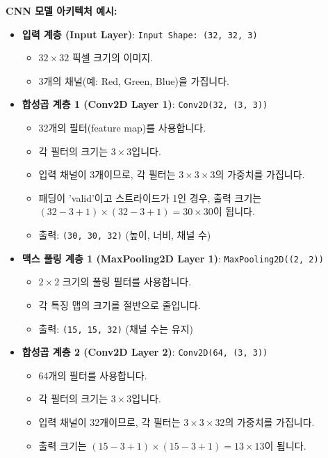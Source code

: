 \documentclass[11pt,a4paper]{article}
\begin{document}
\begin{examplebox}
\textbf{CNN 모델 아키텍처 예시:}
\begin{itemize}
    \item \textbf{입력 계층 (Input Layer)}: \texttt{Input Shape: (32, 32, 3)}
        \begin{itemize}
            \item $32 \times 32$ 픽셀 크기의 이미지.
            \item 3개의 채널(예: Red, Green, Blue)을 가집니다.
        \end{itemize}
    \item \textbf{합성곱 계층 1 (Conv2D Layer 1)}: \texttt{Conv2D(32, (3, 3))}
        \begin{itemize}
            \item 32개의 필터(feature map)를 사용합니다.
            \item 각 필터의 크기는 $3 \times 3$입니다.
            \item 입력 채널이 3개이므로, 각 필터는 $3 \times 3 \times 3$의 가중치를 가집니다.
            \item 패딩이 'valid'이고 스트라이드가 1인 경우, 출력 크기는 $(32-3+1) \times (32-3+1) = 30 \times 30$이 됩니다.
            \item 출력: \texttt{(30, 30, 32)} (높이, 너비, 채널 수)
        \end{itemize}
    \item \textbf{맥스 풀링 계층 1 (MaxPooling2D Layer 1)}: \texttt{MaxPooling2D((2, 2))}
        \begin{itemize}
            \item $2 \times 2$ 크기의 풀링 필터를 사용합니다.
            \item 각 특징 맵의 크기를 절반으로 줄입니다.
            \item 출력: \texttt{(15, 15, 32)} (채널 수는 유지)
        \end{itemize}
    \item \textbf{합성곱 계층 2 (Conv2D Layer 2)}: \texttt{Conv2D(64, (3, 3))}
        \begin{itemize}
            \item 64개의 필터를 사용합니다.
            \item 각 필터의 크기는 $3 \times 3$입니다.
            \item 입력 채널이 32개이므로, 각 필터는 $3 \times 3 \times 32$의 가중치를 가집니다.
            \item 출력 크기는 $(15-3+1) \times (15-3+1) = 13 \times 13$이 됩니다.

\end{itemize}
\end{itemize}
\end{examplebox}
\end{document}
